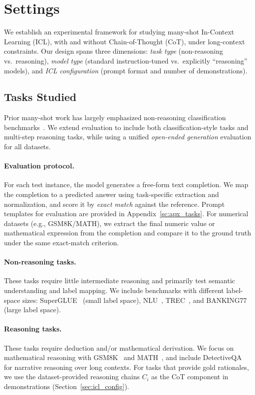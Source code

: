 \documentclass{llmxive}
\begin{document}
\section{Settings}
We establish an experimental framework for studying many-shot In-Context Learning (ICL), with and without Chain-of-Thought (CoT), under long-context constraints.
Our design spans three dimensions: \emph{task type} (non-reasoning vs.\ reasoning), \emph{model type} (standard instruction-tuned vs.\ explicitly ``reasoning'' models), and \emph{ICL configuration} (prompt format and number of demonstrations).



\subsection{Tasks Studied} 
Prior many-shot work has largely emphasized non-reasoning classification benchmarks~\cite{struggle, bertsch-etal-2025-context}.
We extend evaluation to include both classification-style tasks and multi-step reasoning tasks, while using a unified \emph{open-ended generation} evaluation for all datasets.


\paragraph{Evaluation protocol.}
For each test instance, the model generates a free-form text completion.
We map the completion to a predicted answer using task-specific extraction and normalization, and score it by \emph{exact match} against the reference. Prompt templates for evaluation are provided in Appendix~\ref{sc:apx_tasks}.
For numerical datasets (e.g., GSM8K/MATH), we extract the final numeric value or mathematical expression from the completion and compare it to the ground truth under the same exact-match criterion.


\paragraph{Non-reasoning tasks.}
These tasks require little intermediate reasoning and primarily test semantic understanding and label mapping.
We include benchmarks with different label-space sizes: SuperGLUE~\cite{superglue} (small label space), NLU~\cite{nlu}, TREC~\cite{trec}, and BANKING77~\cite{banking} (large label space).

\paragraph{Reasoning tasks.}
These tasks require deduction and/or mathematical derivation.
We focus on mathematical reasoning with GSM8K~\cite{cobbe2021gsm8k} and MATH~\cite{hendrycksmath2021}, and include DetectiveQA~\cite{xu2025detectiveqaevaluatinglongcontextreasoning} for narrative reasoning over long contexts.
For tasks that provide gold rationales, we use the dataset-provided reasoning chains $C_i$ as the CoT component in demonstrations (Section~\ref{sec:icl_config}).
\end{document}
